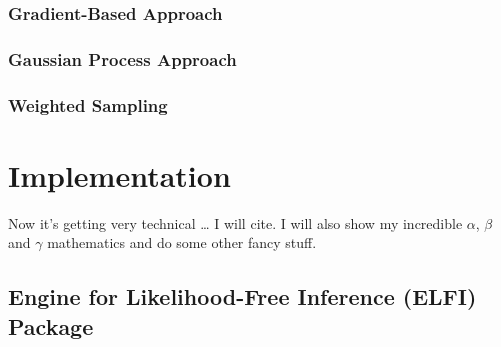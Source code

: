 \documentclass[11pt,twoside]{article}
\numberwithin{Theorem}{section}
\numberwithin{Definition}{section}
\numberwithin{Lemma}{section}
\numberwithin{Algorithm}{section}
\numberwithin{equation}{section}
\begin{document}
\subsubsection{Gradient-Based Approach}

\subsubsection{Gaussian Process Approach}

\subsubsection{Weighted Sampling}

\section{Implementation}

Now it's getting very technical \ldots{} I will cite. I will also show my incredible $\alpha$, $\beta$ and $\gamma$ mathematics and do some other fancy stuff.

\subsection{Engine for Likelihood-Free Inference (ELFI) Package}
\end{document}
